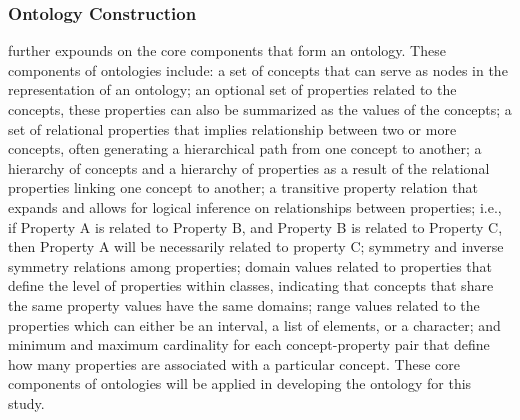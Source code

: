 \subsubsection{Ontology Construction}
 further expounds on the core components that form an ontology. These components of ontologies include:  a set of concepts that can serve as nodes in the representation of an ontology; an optional set of properties related to the concepts, these properties can also be summarized as the values of the concepts; a set of relational properties that implies relationship between two or more concepts, often generating a hierarchical path from one concept to another; a hierarchy of concepts and a hierarchy of properties as a result of the relational properties linking one concept to another; a transitive property relation that expands and allows for logical inference on relationships between properties; i.e., if Property A is related to Property B, and Property B is related to Property C, then Property A will be necessarily related to property C; symmetry and inverse symmetry relations  among properties; domain values related to properties that define the level of properties within classes, indicating that concepts that share the same property values have the same domains; range values related to the properties which can either be an interval, a list of elements, or a character; and minimum and maximum cardinality for each concept-property pair that define how many properties are associated with a particular concept. These core components of ontologies will be applied in developing the ontology for this study.\\

